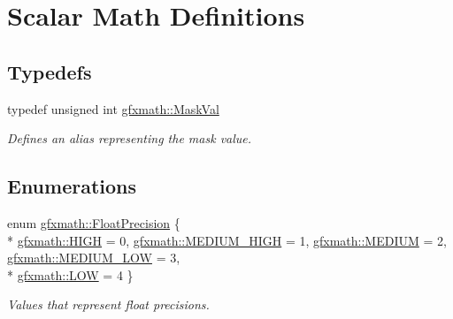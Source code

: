 \hypertarget{group___scalar_math_consts}{}\section{Scalar Math Definitions}
\label{group___scalar_math_consts}
\subsection*{Typedefs}
\begin{DoxyCompactItemize}
\item 
\hypertarget{group___scalar_math_consts_gad991473bd51363f9743013730e68751a}{}typedef unsigned int \hyperlink{group___scalar_math_consts_gad991473bd51363f9743013730e68751a}{gfxmath\+::\+Mask\+Val}\label{group___scalar_math_consts_gad991473bd51363f9743013730e68751a}

\begin{DoxyCompactList}\small\item\em Defines an alias representing the mask value. \end{DoxyCompactList}\end{DoxyCompactItemize}
\subsection*{Enumerations}
\begin{DoxyCompactItemize}
\item 
enum \hyperlink{group___scalar_math_consts_gae1c17f54b4cd35725ae7e4d54d5e8b8f}{gfxmath\+::\+Float\+Precision} \{ \\*
\hyperlink{group___scalar_math_consts_ggae1c17f54b4cd35725ae7e4d54d5e8b8fad850adf6415a0ab37b1c9fe6d3a50592}{gfxmath\+::\+H\+I\+G\+H} = 0, 
\hyperlink{group___scalar_math_consts_ggae1c17f54b4cd35725ae7e4d54d5e8b8faafc62be75ff50981d67b4fe3601020b3}{gfxmath\+::\+M\+E\+D\+I\+U\+M\+\_\+\+H\+I\+G\+H} = 1, 
\hyperlink{group___scalar_math_consts_ggae1c17f54b4cd35725ae7e4d54d5e8b8faae1748fe897ef72c65a32afb59edd9e9}{gfxmath\+::\+M\+E\+D\+I\+U\+M} = 2, 
\hyperlink{group___scalar_math_consts_ggae1c17f54b4cd35725ae7e4d54d5e8b8fab09c406decb8599d2aef4f9a60b7d46b}{gfxmath\+::\+M\+E\+D\+I\+U\+M\+\_\+\+L\+O\+W} = 3, 
\\*
\hyperlink{group___scalar_math_consts_ggae1c17f54b4cd35725ae7e4d54d5e8b8fa373b1e7676b2164a2da51003b901df10}{gfxmath\+::\+L\+O\+W} = 4
 \}
\begin{DoxyCompactList}\small\item\em Values that represent float precisions. \end{DoxyCompactList}\end{DoxyCompactItemize}
